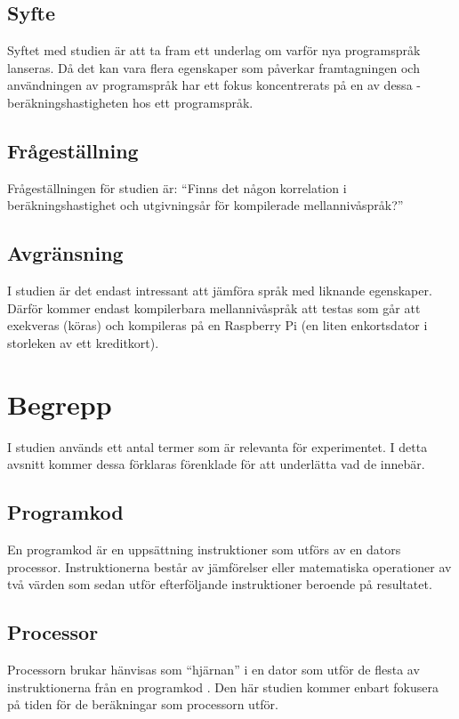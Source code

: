 \documentclass[12pt,swedish]{article}
\begin{document}
\subsection{Syfte}
Syftet med studien är att ta fram ett underlag om varför nya programspråk lanseras. Då det kan vara flera egenskaper som påverkar framtagningen och användningen av programspråk har ett fokus koncentrerats på en av dessa - beräkningshastigheten hos ett programspråk.

\subsection{Frågeställning}
Frågeställningen för studien är: “Finns det någon korrelation i beräkningshastighet och utgivningsår för kompilerade mellannivåspråk?”

\subsection{Avgränsning}
I studien är det endast intressant att jämföra språk med liknande egenskaper. Därför kommer endast kompilerbara mellannivåspråk att testas som går att exekveras (köras) och kompileras på en Raspberry Pi (en liten enkortsdator i storleken av ett kreditkort).


\section{Begrepp}
I studien används ett antal termer som är relevanta för experimentet. I detta avsnitt kommer dessa förklaras förenklade för att underlätta vad de innebär.

\subsection{Programkod}
En programkod är en uppsättning instruktioner som utförs av en dators processor. Instruktionerna består av jämförelser eller matematiska operationer av två värden som sedan utför efterföljande instruktioner beroende på resultatet.

\subsection{Processor}
Processorn brukar hänvisas som “hjärnan” i en dator som utför de flesta av instruktionerna från en programkod \citep{charuba_1996}. Den här studien kommer enbart fokusera på tiden för de beräkningar som processorn utför.
\end{document}

